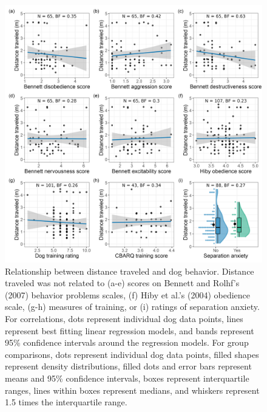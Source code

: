 \documentclass[
  doc]{apa6}
\begin{document}
\begin{figure}

{\centering \includegraphics[width=0.95\linewidth]{figures/dog_behavior} 

}

\caption{Relationship between distance traveled and dog behavior. Distance traveled was not related to (a-e) scores on Bennett and Rolhf's (2007) behavior problems scales, (f) Hiby et al.'s (2004) obedience scale, (g-h) measures of training, or (i) ratings of separation anxiety. For correlations, dots represent individual dog data points, lines represent best fitting linear regression models, and bands represent 95\% confidence intervals around the regression models. For group comparisons, dots represent individual dog data points, filled shapes represent density distributions, filled dots and error bars represent means and 95\% confidence intervals, boxes represent interquartile ranges, lines within boxes represent medians, and whiskers represent 1.5 times the interquartile range. }\label{fig:dog-behavior}
\end{figure}
\end{document}

